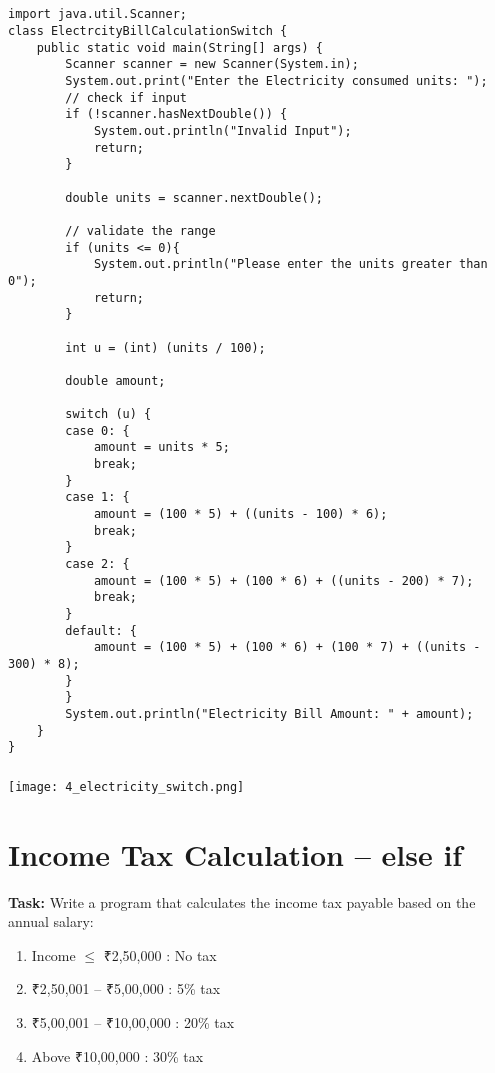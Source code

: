 \documentclass[12pt,a4paper]{article}
\begin{document}
\subsection{}
\begin{lstlisting}
import java.util.Scanner;
class ElectrcityBillCalculationSwitch {
    public static void main(String[] args) {
        Scanner scanner = new Scanner(System.in);
        System.out.print("Enter the Electricity consumed units: ");
        // check if input 
        if (!scanner.hasNextDouble()) {
            System.out.println("Invalid Input");
            return;
        }
    
        double units = scanner.nextDouble();
    
        // validate the range
        if (units <= 0){
            System.out.println("Please enter the units greater than 0");
            return;
        }
        
        int u = (int) (units / 100);
    
        double amount;
    
        switch (u) {
        case 0: {
            amount = units * 5;
            break;
        }
        case 1: {
            amount = (100 * 5) + ((units - 100) * 6);
            break;
        }
        case 2: {
            amount = (100 * 5) + (100 * 6) + ((units - 200) * 7);
            break;
        }
        default: {
            amount = (100 * 5) + (100 * 6) + (100 * 7) + ((units - 300) * 8);
        }
        }
        System.out.println("Electricity Bill Amount: " + amount);
    }
}
\end{lstlisting}

\subsubsection{}
\begin{center}
    \texttt{[image: 4\_electricity\_switch.png]}
\end{center}

\section{Income Tax Calculation -- else if }
\textbf{Task:} Write a program that calculates the income tax payable based on the annual salary:
\begin{enumerate}
    \item Income $\leq$ ₹2,50,000 : No tax
    \item ₹2,50,001 -- ₹5,00,000 : 5\% tax
    \item ₹5,00,001 -- ₹10,00,000 : 20\% tax
    \item Above ₹10,00,000 : 30\% tax
\end{enumerate}
\end{document}
